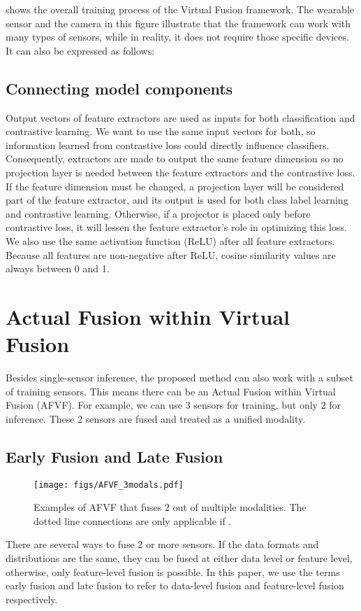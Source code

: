 \documentclass[conference]{IEEEtran}
\begin{document}
 shows the overall training process of the Virtual Fusion framework. The wearable sensor and the camera in this figure illustrate that the framework can work with many types of sensors, while in reality, it does not require those specific devices. It can also be expressed as follows:


\subsection{Connecting model components}
\label{subsec: connect components}
Output vectors of feature extractors are used as inputs for both classification and contrastive learning. We want to use the same input vectors for both, so information learned from contrastive loss could directly influence classifiers. Consequently, extractors are made to output the same feature dimension so no projection layer is needed between the feature extractors and the contrastive loss. If the feature dimension must be changed, a projection layer will be considered part of the feature extractor, and its output is used for both class label learning and contrastive learning. Otherwise, if a projector is placed only before contrastive loss, it will lessen the feature extractor's role in optimizing this loss. We also use the same activation function (ReLU) after all feature extractors. Because all features are non-negative after ReLU, cosine similarity values are always between 0 and 1. 

\section{Actual Fusion within Virtual Fusion}
\label{sec: afvf}
Besides single-sensor inference, the proposed method can also work with a subset of training sensors. This means there can be an Actual Fusion within Virtual Fusion (AFVF). For example, we can use 3 sensors for training, but only 2 for inference. These 2 sensors are fused and treated as a unified modality.

\subsection{Early Fusion and Late Fusion}
\begin{figure}[!t]
\captionsetup{justification=centering}
\centerline{\texttt{[image: figs/AFVF\_3modals.pdf]}}
\caption{Examples of AFVF that fuses 2 out of multiple modalities. The dotted line connections are only applicable if .}
\label{fig: afvf}
\end{figure}
There are several ways to fuse 2 or more sensors. If the data formats and distributions are the same, they can be fused at either data level or feature level, otherwise, only feature-level fusion is possible. In this paper, we use the terms early fusion and late fusion to refer to data-level fusion and feature-level fusion respectively.
\end{document}
